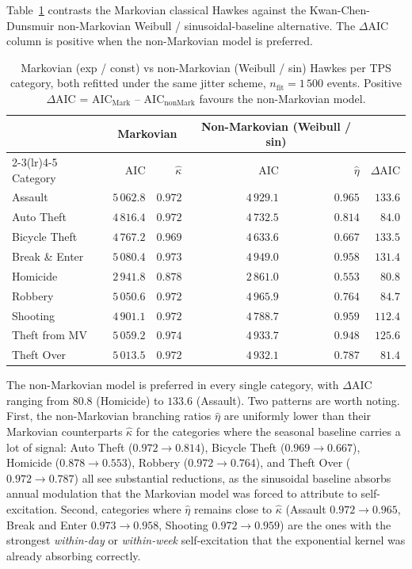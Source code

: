 \documentclass[11pt,a4paper]{article}
\newcommand{\1}{\mathbf{1}}
\theoremstyle{plain}
\theoremstyle{definition}
\begin{document}
Table~\ref{tab:hawkes-mvsnm} contrasts the Markovian classical
Hawkes against the Kwan-Chen-Dunsmuir non-Markovian Weibull /
sinusoidal-baseline alternative.  The $\Delta\mathrm{AIC}$ column
is positive when the non-Markovian model is preferred.

\begin{table}[h]
\centering\small
\caption{Markovian (exp / const) vs non-Markovian (Weibull / sin)
Hawkes per TPS category, both refitted under the same jitter
scheme, $n_{\mathrm{fit}} = 1\,500$ events.  Positive
$\Delta\mathrm{AIC}$ = AIC$_{\text{Mark}}$ -- AIC$_{\text{nonMark}}$
favours the non-Markovian model.}\label{tab:hawkes-mvsnm}
\begin{tabular}{lrrrrr}
\toprule
& \multicolumn{2}{c}{Markovian} &
   \multicolumn{2}{c}{Non-Markovian (Weibull / sin)} & \\
\cmidrule(lr){2-3}\cmidrule(lr){4-5}
Category & AIC & $\hat\kappa$ & AIC & $\hat\eta$ & $\Delta\mathrm{AIC}$\\\midrule
Assault       & $5\,062.8$ & $0.972$ & $4\,929.1$ & $0.965$ & $133.6$\\
Auto Theft    & $4\,816.4$ & $0.972$ & $4\,732.5$ & $0.814$ & $\phantom{0}84.0$\\
Bicycle Theft & $4\,767.2$ & $0.969$ & $4\,633.6$ & $0.667$ & $133.5$\\
Break \& Enter& $5\,080.4$ & $0.973$ & $4\,949.0$ & $0.958$ & $131.4$\\
Homicide      & $2\,941.8$ & $0.878$ & $2\,861.0$ & $0.553$ & $\phantom{0}80.8$\\
Robbery       & $5\,050.6$ & $0.972$ & $4\,965.9$ & $0.764$ & $\phantom{0}84.7$\\
Shooting      & $4\,901.1$ & $0.972$ & $4\,788.7$ & $0.959$ & $112.4$\\
Theft from MV & $5\,059.2$ & $0.974$ & $4\,933.7$ & $0.948$ & $125.6$\\
Theft Over    & $5\,013.5$ & $0.972$ & $4\,932.1$ & $0.787$ & $\phantom{0}81.4$\\
\bottomrule
\end{tabular}
\end{table}

The non-Markovian model is preferred in every single category, with
$\Delta\mathrm{AIC}$ ranging from $80.8$ (Homicide) to $133.6$
(Assault).  Two patterns are worth noting.  First, the
non-Markovian branching ratios $\hat\eta$ are uniformly lower than
their Markovian counterparts $\hat\kappa$ for the categories where
the seasonal baseline carries a lot of signal: Auto Theft
($0.972 \to 0.814$), Bicycle Theft ($0.969 \to 0.667$), Homicide
($0.878 \to 0.553$), Robbery ($0.972 \to 0.764$), and Theft Over
($0.972 \to 0.787$) all see substantial reductions, as the
sinusoidal baseline absorbs annual modulation that the Markovian
model was forced to attribute to self-excitation.  Second,
categories where $\hat\eta$ remains close to $\hat\kappa$
(Assault $0.972 \to 0.965$, Break and Enter $0.973 \to 0.958$,
Shooting $0.972 \to 0.959$) are the ones with the strongest
\emph{within-day} or \emph{within-week} self-excitation that the
exponential kernel was already absorbing correctly.
\end{document}
